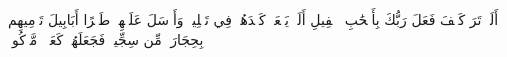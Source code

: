 أَلَمۡ تَرَ كَيۡفَ فَعَلَ رَبُّكَ بِأَصۡحَٰبِ ٱلۡفِيلِ
أَلَمۡ يَجۡعَلۡ كَيۡدَهُمۡ فِي تَضۡلِيلٖ
وَأَرۡسَلَ عَلَيۡهِمۡ طَيۡرًا أَبَابِيلَ
تَرۡمِيهِم بِحِجَارَةٖ مِّن سِجِّيلٖ
فَجَعَلَهُمۡ كَعَصۡفٖ مَّأۡكُولِۭ